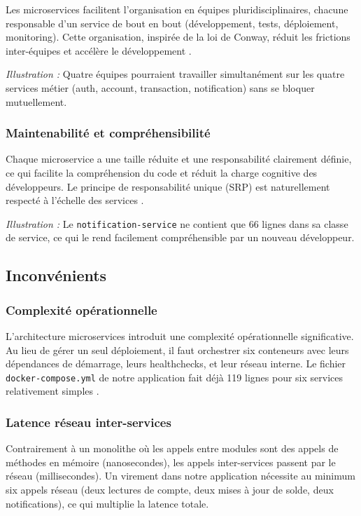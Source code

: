 \documentclass[12pt,a4paper]{article}
\begin{document}
Les microservices facilitent l'organisation en équipes pluridisciplinaires, chacune responsable d'un service de bout en bout (développement, tests, déploiement, monitoring). Cette organisation, inspirée de la loi de Conway, réduit les frictions inter-équipes et accélère le développement \cite{conway1968}.

\textit{Illustration :} Quatre équipes pourraient travailler simultanément sur les quatre services métier (auth, account, transaction, notification) sans se bloquer mutuellement.

\subsubsection{Maintenabilité et compréhensibilité}

Chaque microservice a une taille réduite et une responsabilité clairement définie, ce qui facilite la compréhension du code et réduit la charge cognitive des développeurs. Le principe de responsabilité unique (SRP) est naturellement respecté à l'échelle des services \cite{martin2017}.

\textit{Illustration :} Le \texttt{notification-service} ne contient que 66 lignes dans sa classe de service, ce qui le rend facilement compréhensible par un nouveau développeur.

\subsection{Inconvénients}

\subsubsection{Complexité opérationnelle}

L'architecture microservices introduit une complexité opérationnelle significative. Au lieu de gérer un seul déploiement, il faut orchestrer six conteneurs avec leurs dépendances de démarrage, leurs healthchecks, et leur réseau interne. Le fichier \texttt{docker-compose.yml} de notre application fait déjà 119 lignes pour six services relativement simples \cite{richardson2018}.

\subsubsection{Latence réseau inter-services}

Contrairement à un monolithe où les appels entre modules sont des appels de méthodes en mémoire (nanosecondes), les appels inter-services passent par le réseau (millisecondes). Un virement dans notre application nécessite au minimum six appels réseau (deux lectures de compte, deux mises à jour de solde, deux notifications), ce qui multiplie la latence totale.
\end{document}
